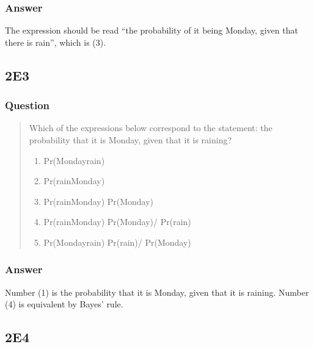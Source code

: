 \documentclass[
]{book}
\providecommand{\tightlist}{%
  \setlength{\itemsep}{0pt}\setlength{\parskip}{0pt}}
\begin{document}
\hypertarget{answer-1}{%
\subsubsection*{Answer}\label{answer-1}}

The expression should be read ``the probability of it being Monday, given that there is rain'', which is (3).

\hypertarget{e3}{%
\subsection*{2E3}\label{e3}}

\hypertarget{question-2}{%
\subsubsection*{Question}\label{question-2}}

\begin{quote}
Which of the expressions below correspond to the statement: the probability that it is Monday, given that it is raining?

\begin{enumerate}
\def\labelenumi{(\arabic{enumi})}
\tightlist
\item
  Pr(Monday\textbar rain)
\item
  Pr(rain\textbar Monday)
\item
  Pr(rain\textbar Monday) Pr(Monday)
\item
  Pr(rain\textbar Monday) Pr(Monday)/ Pr(rain)
\item
  Pr(Monday\textbar rain) Pr(rain)/ Pr(Monday)
\end{enumerate}
\end{quote}

\hypertarget{answer-2}{%
\subsubsection*{Answer}\label{answer-2}}

Number (1) is the probability that it is Monday, given that it is raining. Number (4) is equivalent by Bayes' rule.

\hypertarget{e4}{%
\subsection*{2E4}\label{e4}}
\end{document}
